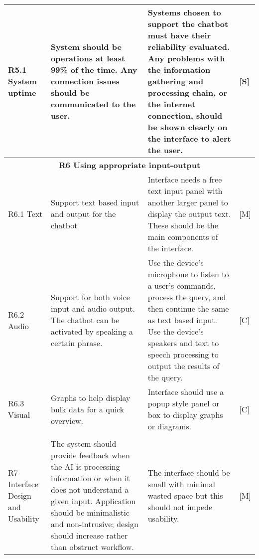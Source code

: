 \documentclass[9pt]{article} %
\begin{document}
\begin{center}
\begin{longtable}{ | m{3cm} | m{7cm} | m{7cm} | m{0.5cm} | }
		\hline	
		
		R5.1 System uptime & 
		System should be operations at least 99\% of the time.	Any connection issues should be communicated to the user. &
		Systems chosen to support the chatbot must have their reliability evaluated. Any problems with the information gathering and processing chain, or the internet connection, should be shown clearly on the interface to alert the user. &
		[S] \\
		
		\hline
		
		\multicolumn{4}{|c|}{\textbf{R6 Using appropriate input-output}} \\

		\hline
		
		R6.1 Text & 
		Support text based input and output for the chatbot & 
		Interface needs a free text input panel with another larger panel to display the output text. These should be the main components of the interface. & 
		[M] \\
		
		\hline
		
		R6.2 Audio & 
		Support for both voice input and audio output. The chatbot can be activated by speaking a certain phrase. & 
		Use the device’s microphone to listen to a user's commands, process the query, and then continue the same as text based input. Use the device’s speakers and text to speech processing to output the results of the query. & 
		[C] \\
		
		\hline
		
		R6.3 Visual & 
		Graphs to help display bulk data for a quick overview. & 
		Interface should use a popup style panel or box to display graphs or diagrams. &
		[C] \\
		
		\hline
		
		\multicolumn{4}{|c|}{} \\
		
		\hline
		
		R7 Interface Design and Usability & 
		The system should provide feedback when the AI is processing information or when it does not understand a given input. Application should be minimalistic and non-intrusive; design should increase rather than obstruct workflow. & 
		The interface should be small with minimal wasted space but this should not impede usability. & 
		[M] \\
		
		\hline
		

\end{longtable}
\end{center}
\end{document}
